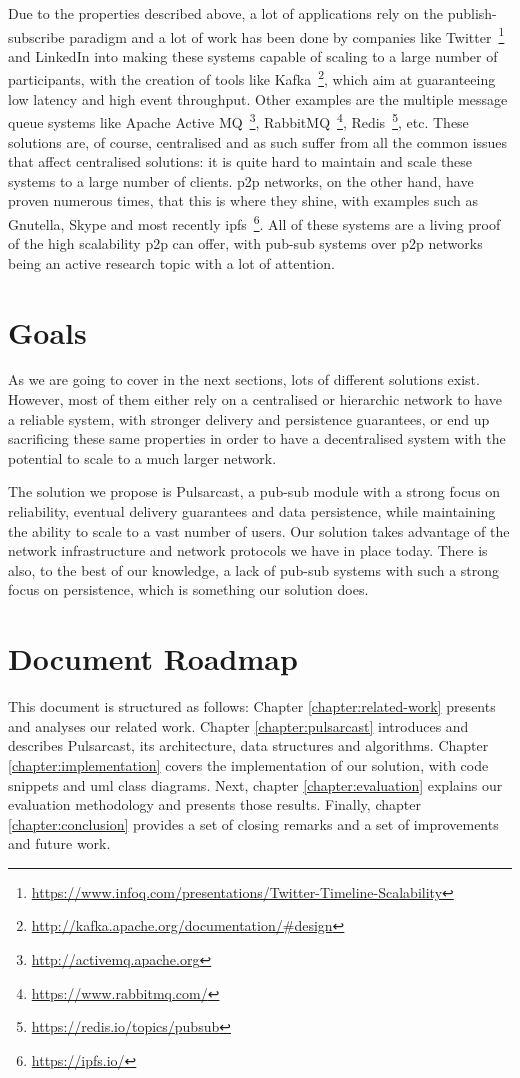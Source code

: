 Due to the properties described above, a lot of applications rely on the
publish-subscribe paradigm and a lot of work has been done by companies like
Twitter~\footnote{\url{https://www.infoq.com/presentations/Twitter-Timeline-Scalability}}
and LinkedIn into making these systems capable of scaling to a large number of
participants, with the creation of tools like
Kafka~\footnote{\url{http://kafka.apache.org/documentation/\#design}}, which
aim at guaranteeing low latency and high event throughput. Other examples are
the multiple message queue systems like Apache Active
MQ~\footnote{\url{http://activemq.apache.org}},
RabbitMQ~\footnote{\url{https://www.rabbitmq.com/}},
Redis~\footnote{\url{https://redis.io/topics/pubsub}}, etc.  These solutions
are, of course, centralised and as such suffer from all the common issues that
affect centralised solutions: it is quite hard to maintain and scale these
systems to a large number of clients. \acrfull{p2p} networks, on the other
hand, have proven numerous times, that this is where they shine, with examples
such as Gnutella, Skype and most recently
\acrshort{ipfs}~\footnote{\url{https://ipfs.io/}}.  All of these systems are a
living proof of the high scalability \acrshort{p2p} can offer, with pub-sub
systems over \acrshort{p2p} networks being an active research topic with a lot
of attention.

\section{Goals}

As we are going to cover in the next sections, lots of different
solutions exist. However, most of them either rely on a
centralised or hierarchic network to have a reliable system, with
stronger delivery and persistence guarantees, or end up sacrificing
these same properties in order to have a decentralised system with the
potential to scale to a much larger network.

The solution we propose is Pulsarcast, a pub-sub module with a strong focus on
reliability, eventual delivery guarantees and data persistence, while
maintaining the ability to scale to a vast number of users. Our solution takes
advantage of the network infrastructure and network protocols we have in place
today. There is also, to the best of our knowledge, a lack of pub-sub systems
with such a strong focus on persistence, which is something our solution does.

\section{Document Roadmap}

This document is structured as follows: Chapter \ref{chapter:related-work}
presents and analyses our related work. Chapter \ref{chapter:pulsarcast}
introduces and describes Pulsarcast, its architecture, data structures and
algorithms. Chapter \ref{chapter:implementation} covers the implementation of
our solution, with code snippets and \acrshort{uml} class diagrams. Next,
chapter \ref{chapter:evaluation} explains our evaluation methodology and
presents those results. Finally, chapter \ref{chapter:conclusion} provides a
set of closing remarks and a set of improvements and future work.

